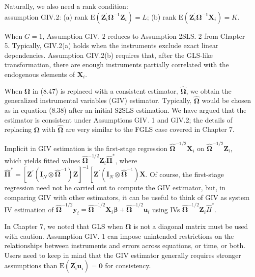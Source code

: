 \documentclass[10pt]{article}
\begin{document}
Naturally, we also need a rank condition:\\
assumption GIV.2: (a) rank $\mathrm{E}\left(\mathbf{Z}_{i}^{\prime} \boldsymbol{\Omega}^{-1} \mathbf{Z}_{i}\right)=L$; (b) rank $\mathrm{E}\left(\mathbf{Z}_{i}^{\prime} \boldsymbol{\Omega}^{-1} \mathbf{X}_{i}\right)=K$.

When $G=1$, Assumption GIV. 2 reduces to Assumption 2SLS. 2 from Chapter 5. Typically, GIV.2(a) holds when the instruments exclude exact linear dependencies. Assumption GIV.2(b) requires that, after the GLS-like transformation, there are enough instruments partially correlated with the endogenous elements of $\mathbf{X}_{i}$.

When $\boldsymbol{\Omega}$ in (8.47) is replaced with a consistent estimator, $\hat{\boldsymbol{\Omega}}$, we obtain the generalized instrumental variables (GIV) estimator. Typically, $\hat{\boldsymbol{\Omega}}$ would be chosen as in equation (8.38) after an initial S2SLS estimation. We have argued that the estimator is consistent under Assumptions GIV. 1 and GIV.2; the details of replacing $\boldsymbol{\Omega}$ with $\hat{\boldsymbol{\Omega}}$ are very similar to the FGLS case covered in Chapter 7.

Implicit in GIV estimation is the first-stage regression $\hat{\boldsymbol{\Omega}}^{-1 / 2} \mathbf{X}_{i}$ on $\hat{\boldsymbol{\Omega}}^{-1 / 2} \mathbf{Z}_{i}$, which yields fitted values $\hat{\boldsymbol{\Omega}}^{-1 / 2} \mathbf{Z}_{i} \hat{\boldsymbol{\Pi}}^{*}$, where $\hat{\boldsymbol{\Pi}}^{*}=\left[\mathbf{Z}^{\prime}\left(\mathbf{I}_{N} \otimes \hat{\boldsymbol{\Omega}}^{-1}\right) \mathbf{Z}\right]^{-1}\left[\mathbf{Z}^{\prime}\left(\mathbf{I}_{N} \otimes \hat{\boldsymbol{\Omega}}^{-1}\right) \mathbf{X}\right.$. Of course, the first-stage regression need not be carried out to compute the GIV estimator, but, in comparing GIV with other estimators, it can be useful to think of GIV as system IV estimation of $\hat{\boldsymbol{\Omega}}^{-1 / 2} \mathbf{y}_{i}=\hat{\boldsymbol{\Omega}}^{-1 / 2} \mathbf{X}_{i} \boldsymbol{\beta}+\hat{\boldsymbol{\Omega}}^{-1 / 2} \mathbf{u}_{i}$ using IVs $\hat{\boldsymbol{\Omega}}^{-1 / 2} \mathbf{Z}_{i} \hat{\Pi}^{*}$.

In Chapter 7, we noted that GLS when $\boldsymbol{\Omega}$ is not a diagonal matrix must be used with caution. Assumption GIV. 1 can impose unintended restrictions on the relationships between instruments and errors across equations, or time, or both. Users need to keep in mind that the GIV estimator generally requires stronger assumptions than $\mathrm{E}\left(\mathbf{Z}_{i}^{\prime} \mathbf{u}_{i}\right)=\mathbf{0}$ for consistency.
\end{document}
